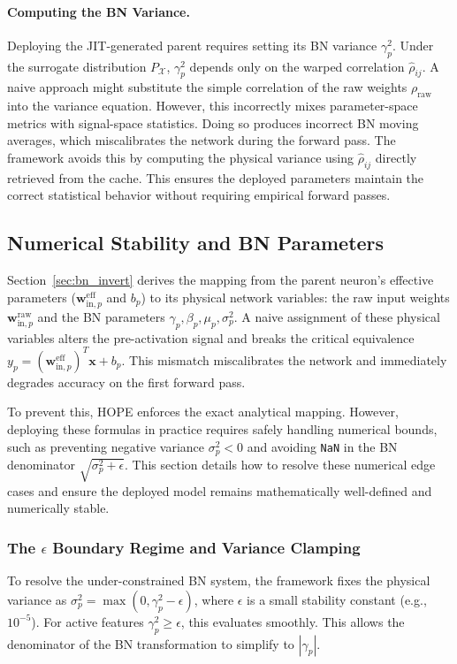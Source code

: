 \documentclass[11pt, a4paper, copyright, gdm]{google}
\newcommand{\wVect}{\boldsymbol{w}}
\newcommand{\xVect}{\boldsymbol{x}}
\newcommand{\calX}{\mathcal{X}}
\theoremstyle{definition}
\begin{document}
\paragraph{Computing the BN Variance.}
Deploying the JIT-generated parent requires setting its BN variance $\gamma_p^2$. Under the surrogate distribution $P_{\calX}$, $\gamma_p^2$ depends only on the warped correlation $\hat{\rho}_{ij}$. A naive approach might substitute the simple correlation of the raw weights $\rho_{\text{raw}}$ into the variance equation. However, this incorrectly mixes parameter-space metrics with signal-space statistics. Doing so produces incorrect BN moving averages, which miscalibrates the network during the forward pass. The framework avoids this by computing the physical variance using $\hat{\rho}_{ij}$ directly retrieved from the cache. This ensures the deployed parameters maintain the correct statistical behavior without requiring empirical forward passes.


\subsection{Numerical Stability and BN Parameters}
\label{sec:numerical_stability_BN}

Section~\ref{sec:bn_invert} derives the mapping from the parent neuron's effective parameters ($\wVect_{\text{in},p}^{\text{eff}}$ and $b_p$) to its physical network variables: the raw input weights $\wVect_{\text{in},p}^{\text{raw}}$ and the BN parameters $\gamma_p, \beta_p, \mu_p, \sigma_p^2$. A naive assignment of these physical variables alters the pre-activation signal and breaks the critical equivalence $y_p = (\wVect_{\text{in},p}^{\text{eff}})^T \xVect + b_p$. This mismatch miscalibrates the network and immediately degrades accuracy on the first forward pass.

To prevent this, HOPE enforces the exact analytical mapping. However, deploying these formulas in practice requires safely handling numerical bounds, such as preventing negative variance $\sigma_p^2 < 0$ and avoiding \texttt{NaN} in the BN denominator $\sqrt{\sigma_p^2 + \epsilon}$. This section details how to resolve these numerical edge cases and ensure the deployed model remains mathematically well-defined and numerically stable.

\subsubsection{The $\epsilon$ Boundary Regime and Variance Clamping}
To resolve the under-constrained BN system, the framework fixes the physical variance as $\sigma_p^2 = \max(0, \gamma_p^2 - \epsilon)$, where $\epsilon$ is a small stability constant (e.g., $10^{-5}$). For active features $\gamma_p^2 \ge \epsilon$, this evaluates smoothly. This allows the denominator of the BN transformation to simplify to $|\gamma_p|$.
\end{document}
